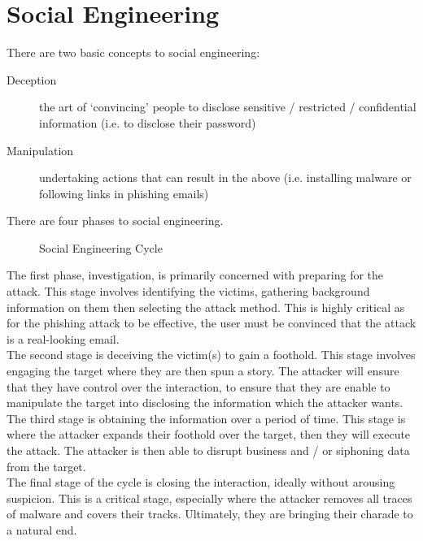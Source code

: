 
\section{Social Engineering}
There are two basic concepts to social engineering:
\begin{description}
    \item[Deception] the art of `convincing' people to disclose sensitive / restricted / confidential information (i.e. to disclose their password)
    \item[Manipulation] undertaking actions that can result in the above (i.e. installing malware or following links in phishing emails) 
\end{description}

There are four phases to social engineering. 

\begin{figure}[H]
    \centering
    \caption{Social Engineering Cycle}    
\end{figure}

The first phase, investigation, is primarily concerned with preparing for the attack. This stage involves identifying the victims, gathering background information on them then selecting the attack method. This is highly critical as for the phishing attack to be effective, the user must be convinced that the attack is a real-looking email.\\

The second stage is deceiving the victim(s) to gain a foothold. This stage involves engaging the target where they are then spun a story. The attacker will ensure that they have control over the interaction, to ensure that they are enable to manipulate the target into disclosing the information which the attacker wants.\\

The third stage is obtaining the information over a period of time. This stage is where the attacker expands their foothold over the target, then they will execute the attack. The attacker is then able to disrupt business and / or siphoning data from the target.\\

The final stage of the cycle is closing the interaction, ideally without arousing suspicion. This is a critical stage, especially where the attacker removes all traces of malware and covers their tracks. Ultimately, they are bringing their charade to a natural end.

